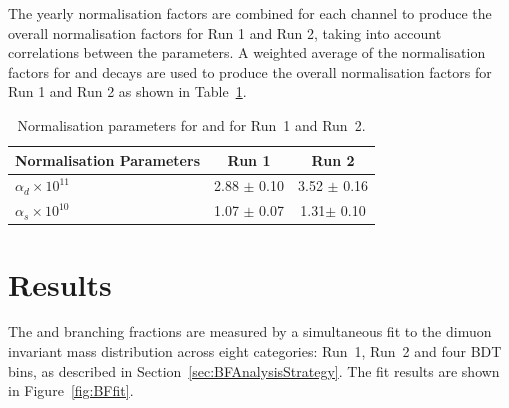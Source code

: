 {The yearly normalisation factors are combined for each channel to produce the overall normalisation factors for Run 1 and Run 2, taking into account correlations between the parameters. A weighted average of the normalisation factors for \bdkpi and \bujpsik decays are used to produce the overall normalisation factors for Run 1 and Run 2 as shown in Table~\ref{tab:normparams}.

\begin{table}[tb]
\begin{center}
\begin{tabular}{lcc}
\toprule \toprule
Normalisation Parameters & Run 1 & Run 2 \\ \midrule
$\alpha_{d} \times 10^{11}$ & 2.88 $\pm$ 0.10 & 3.52 $\pm$ 0.16 \\ %
$\alpha_{s} \times 10^{10}$ & 1.07 $\pm$ 0.07 & 1.31$ \pm$ 0.10 \\
\bottomrule \bottomrule
\end{tabular}
\vspace{0.7cm}
\caption{Normalisation parameters for \bsmumu and \bdmumu for Run~1 and Run~2.}
\label{tab:normparams}
\end{center}
\vspace{-1.0cm}
\end{table}


\section{Results}
\label{sec:BFResults}

The \bdmumu and \bsmumu branching fractions are measured by a simultaneous fit to the dimuon invariant mass distribution across eight categories: Run~1, Run~2 and four BDT bins, as described in Section~\ref{sec:BFAnalysisStrategy}. %
The fit results are shown in Figure~\ref{fig:BFfit}.

}
